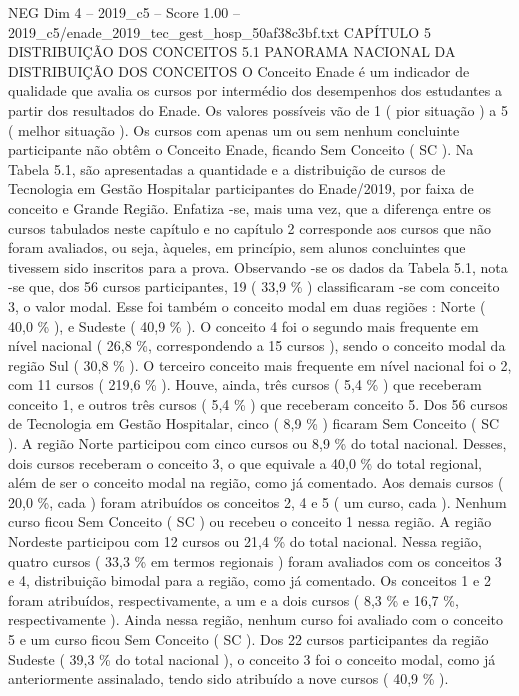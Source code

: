 \begin{textsample}{NEG Dim 4 – 2019\_c5 – Score 1.00 – 2019\_c5/enade\_2019\_tec\_gest\_hosp\_50af38c3bf.txt}  \label{ex:f4_neg_167}
CAPÍTULO 5 DISTRIBUIÇÃO DOS CONCEITOS 5.1 PANORAMA NACIONAL DA DISTRIBUIÇÃO DOS CONCEITOS O Conceito Enade é um indicador de qualidade que avalia os cursos por intermédio dos desempenhos dos estudantes a partir dos resultados do Enade.
Os valores possíveis vão de 1 ( pior situação ) a 5 ( melhor situação ).
Os cursos com apenas um ou sem nenhum concluinte participante não obtêm o Conceito Enade, ficando Sem Conceito ( SC ).
Na Tabela 5.1, são apresentadas a quantidade e a distribuição de cursos de Tecnologia em Gestão Hospitalar participantes do Enade/2019, por faixa de conceito e Grande Região.
Enfatiza -se, mais uma vez, que a diferença entre os cursos tabulados neste capítulo e no capítulo 2 corresponde aos cursos que não foram avaliados, ou seja, àqueles, em princípio, sem alunos concluintes que tivessem sido inscritos para a prova.
Observando -se os dados da Tabela 5.1, nota -se que, dos 56 cursos participantes, 19 ( 33,9 \% ) classificaram -se com conceito 3, o valor modal.
Esse foi também o conceito modal em duas regiões : Norte ( 40,0 \% ), e Sudeste ( 40,9 \% ).
O conceito 4 foi o segundo mais frequente em nível nacional ( 26,8 \%, correspondendo a 15 cursos ), sendo o conceito modal da região Sul ( 30,8 \% ).
O terceiro conceito mais frequente em nível nacional foi o 2, com 11 cursos ( 219,6 \% ).
Houve, ainda, três cursos ( 5,4 \% ) que receberam conceito 1, e outros três cursos ( 5,4 \% ) que receberam conceito 5.
Dos 56 cursos de Tecnologia em Gestão Hospitalar, cinco ( 8,9 \% ) ficaram Sem Conceito ( SC ).
A região Norte participou com cinco cursos ou 8,9 \% do total nacional.
Desses, dois cursos receberam o conceito 3, o que equivale a 40,0 \% do total regional, além de ser o conceito modal na região, como já comentado.
Aos demais cursos ( 20,0 \%, cada ) foram atribuídos os conceitos 2, 4 e 5 ( um curso, cada ).
Nenhum curso ficou Sem Conceito ( SC ) ou recebeu o conceito 1 nessa região.
A região Nordeste participou com 12 cursos ou 21,4 \% do total nacional.
Nessa região, quatro cursos ( 33,3 \% em termos regionais ) foram avaliados com os conceitos 3 e 4, distribuição bimodal para a região, como já comentado.
Os conceitos 1 e 2 foram atribuídos, respectivamente, a um e a dois cursos ( 8,3 \% e 16,7 \%, respectivamente ).
Ainda nessa região, nenhum curso foi avaliado com o conceito 5 e um curso ficou Sem Conceito ( SC ).
Dos 22 cursos participantes da região Sudeste ( 39,3 \% do total nacional ), o conceito 3 foi o conceito modal, como já anteriormente assinalado, tendo sido atribuído a nove cursos ( 40,9 \% ).

\end{textsample}
